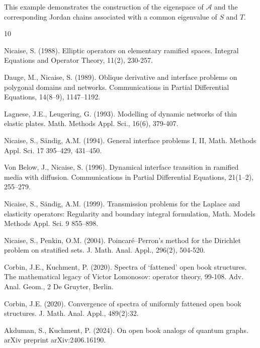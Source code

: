 \documentclass[reqno]{amsart}
\theoremstyle{definition}
\theoremstyle{remark}
\numberwithin{equation}{section}
\newcommand{\cA}{\mathcal{A}}
\begin{document}
This example demonstrates the construction of the eigenspace of $\cA$ and the corresponding Jordan chains associated with a common eigenvalue of $S$ and $T$.



\begin{thebibliography}{10}


    Nicaise, S. (1988). Elliptic operators on elementary ramified spaces. Integral Equations and Operator Theory, 11(2), 230-257.
   
    Dauge, M.,  Nicaise, S. (1989). Oblique derivative and interface problems on polygonal domains and networks. Communications in Partial Differential Equations, 14(8–9), 1147–1192. 
    
    Lagnese, J.E., Leugering, G. (1993). Modelling of dynamic networks of thin elastic plates. Math. Methods Appl. Sci., 16(6), 379-407.
    
    Nicaise, S.,  S\"{a}ndig, A.M. (1994). General interface problems I, II, Math. Methods Appl. Sci. 17 395–429, 431–450.

    Von Below, J.,  Nicaise, S. (1996). Dynamical interface transition in ramified media with diffusion. Communications in Partial Differential Equations, 21(1–2), 255–279. 

    Nicaise, S.,  S\"{a}ndig, A.M. (1999). Transmission problems for the Laplace and elasticity operators: Regularity and boundary integral formulation, Math. Models Methods Appl. Sci. 9  855–898.

    Nicaise, S., Penkin, O.M. (2004). Poincaré–Perron's method for the Dirichlet problem on stratified sets. J. Math. Anal. Appl., 296(2), 504-520.

    Corbin, J.E., Kuchment, P. (2020).  Spectra of `fattened' open book structures. The mathe\-matical legacy of Victor Lomonosov: operator theory, 99-108. Adv. Anal. Geom., 2 De Gruyter, Berlin.
    
    Corbin, J.E. (2020). Convergence of spectra of uniformly fattened open book structures. J. Math. Anal. Appl., 489(2):32.

    
    Akduman, S., Kuchment, P. (2024). On open book analogs of quantum graphs. arXiv preprint arXiv:2406.16190.



\end{thebibliography}
\end{document}
